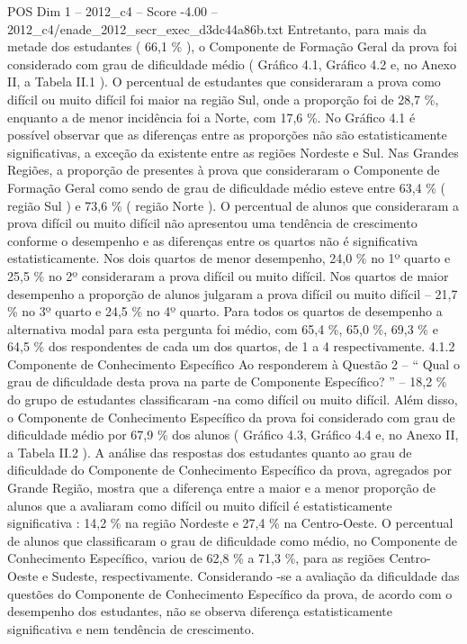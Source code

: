 \begin{textsample}{POS Dim 1 – 2012\_c4 – Score -4.00 – 2012\_c4/enade\_2012\_secr\_exec\_d3dc44a86b.txt}
Entretanto, para mais da metade dos estudantes ( 66,1 \% ), o Componente de Formação Geral da prova foi considerado com grau de dificuldade médio ( Gráfico 4.1, Gráfico 4.2 e, no Anexo II, a Tabela II.1 ).
O percentual de estudantes que consideraram a prova como difícil ou muito difícil foi maior na região Sul, onde a proporção foi de 28,7 \%, enquanto a de menor incidência foi a Norte, com 17,6 \%.
No Gráfico 4.1 é possível observar que as diferenças entre as proporções não são estatisticamente significativas, a exceção da existente entre as regiões Nordeste e Sul.
Nas Grandes Regiões, a proporção de presentes à prova que consideraram o Componente de Formação Geral como sendo de grau de dificuldade médio esteve entre 63,4 \% ( região Sul ) e 73,6 \% ( região Norte ).
O percentual de alunos que consideraram a prova difícil ou muito difícil não apresentou uma tendência de crescimento conforme o desempenho e as diferenças entre os quartos não é significativa estatisticamente.
Nos dois quartos de menor desempenho, 24,0 \% no 1º quarto e 25,5 \% no 2º consideraram a prova difícil ou muito difícil.
Nos quartos de maior desempenho a proporção de alunos julgaram a prova difícil ou muito difícil – 21,7 \% no 3º quarto e 24,5 \% no 4º quarto.
Para todos os quartos de desempenho a alternativa modal para esta pergunta foi médio, com 65,4 \%, 65,0 \%, 69,3 \% e 64,5 \% dos respondentes de cada um dos quartos, de 1 a 4 respectivamente. 4.1.2 Componente de Conhecimento Específico Ao responderem à Questão 2 – “ Qual o grau de dificuldade desta prova na parte de Componente Específico? ” – 18,2 \% do grupo de estudantes classificaram -na como difícil ou muito difícil.
Além disso, o Componente de Conhecimento Específico da prova foi considerado com grau de dificuldade médio por 67,9 \% dos alunos ( Gráfico 4.3, Gráfico 4.4 e, no Anexo II, a Tabela II.2 ).
A análise das respostas dos estudantes quanto ao grau de dificuldade do Componente de Conhecimento Específico da prova, agregados por Grande Região, mostra que a diferença entre a maior e a menor proporção de alunos que a avaliaram como difícil ou muito difícil é estatisticamente significativa : 14,2 \% na região Nordeste e 27,4 \% na Centro-Oeste.
O percentual de alunos que classificaram o grau de dificuldade como médio, no Componente de Conhecimento Específico, variou de 62,8 \% a 71,3 \%, para as regiões Centro-Oeste e Sudeste, respectivamente.
Considerando -se a avaliação da dificuldade das questões do Componente de Conhecimento Específico da prova, de acordo com o desempenho dos estudantes, não se observa diferença estatisticamente significativa e nem tendência de crescimento.

\end{textsample}
